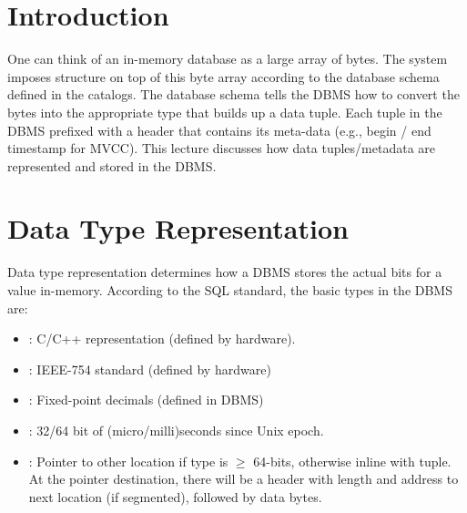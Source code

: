 \documentclass[11pt]{article}
\begin{document}
\maketitle
\thispagestyle{plain}

\section{Introduction}
One can think of an in-memory database as a large array of bytes. The system imposes structure on top of this byte array according to the database schema defined in the catalogs. The database schema tells the DBMS how to convert the bytes into the appropriate type that builds up a data tuple. Each tuple in the DBMS prefixed with a header that contains its meta-data (e.g., begin / end timestamp for MVCC). This lecture discusses how data tuples/metadata are represented and stored in the DBMS.

\section{Data Type Representation}
Data type representation determines how a DBMS stores the actual bits for a value in-memory. According to the SQL standard, the basic types in the DBMS are:
\begin{itemize}
    \item {}: C/C++ representation (defined by hardware).
    \item {}: IEEE-754 standard (defined by hardware)
    \item {}: Fixed-point decimals (defined in DBMS)
    \item {}: 32/64 bit of (micro/milli)seconds since Unix epoch.
    \item {}: Pointer to other location if type is $\geq$ 64-bits, otherwise inline with tuple. At the pointer destination, there will be a header with length and address to next location (if segmented), followed by data bytes.
\end{itemize}

\end{document}
